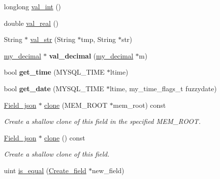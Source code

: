 \begin{DoxyCompactItemize}
\item 
longlong \mbox{\hyperlink{classField__json_ad4ef5b9c29c33a94bbd24a324cd3b3d1}{val\+\_\+int}} ()
\item 
double \mbox{\hyperlink{classField__json_a762fad5750af247d8d2ebbc3dedf2113}{val\+\_\+real}} ()
\item 
String $\ast$ \mbox{\hyperlink{classField__json_a1a8e0ba0f036d69c1b7567fcf7d9493a}{val\+\_\+str}} (String $\ast$tmp, String $\ast$str)
\item 
\mbox{\label{classField__json_a850a4631c2a02d1c0424b900acc455ab}} 
\mbox{\hyperlink{classmy__decimal}{my\+\_\+decimal}} $\ast$ {\bfseries val\+\_\+decimal} (\mbox{\hyperlink{classmy__decimal}{my\+\_\+decimal}} $\ast$m)
\item 
\mbox{\label{classField__json_a0b5b91977d62e5dc1c552ad74a48be71}} 
bool {\bfseries get\+\_\+time} (M\+Y\+S\+Q\+L\+\_\+\+T\+I\+ME $\ast$ltime)
\item 
\mbox{\label{classField__json_ade8e49ba299c2580c4189e99ecdaf4aa}} 
bool {\bfseries get\+\_\+date} (M\+Y\+S\+Q\+L\+\_\+\+T\+I\+ME $\ast$ltime, my\+\_\+time\+\_\+flags\+\_\+t fuzzydate)
\item 
\mbox{\label{classField__json_a11344951b6e0e08fd89726b23b0c8426}} 
\mbox{\hyperlink{classField__json}{Field\+\_\+json}} $\ast$ \mbox{\hyperlink{classField__json_a11344951b6e0e08fd89726b23b0c8426}{clone}} (M\+E\+M\+\_\+\+R\+O\+OT $\ast$mem\+\_\+root) const
\begin{DoxyCompactList}\small\item\em Create a shallow clone of this field in the specified M\+E\+M\+\_\+\+R\+O\+OT. \end{DoxyCompactList}\item 
\mbox{\label{classField__json_a5a39dbb204102637da9435f0fc380b52}} 
\mbox{\hyperlink{classField__json}{Field\+\_\+json}} $\ast$ \mbox{\hyperlink{classField__json_a5a39dbb204102637da9435f0fc380b52}{clone}} () const
\begin{DoxyCompactList}\small\item\em Create a shallow clone of this field. \end{DoxyCompactList}\item 
uint \mbox{\hyperlink{classField__json_a12d3ba38a6c987f627dce55780947578}{is\+\_\+equal}} (\mbox{\hyperlink{classCreate__field}{Create\+\_\+field}} $\ast$new\+\_\+field)

\end{DoxyCompactItemize}
